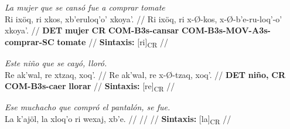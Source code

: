 \documentclass{article}%
\begin{document}
%
\par\medskip%
\ex
\textit{La mujer que se cansó fue a comprar tomate} \\
\begingl
\gla Ri ixöq, ri xkos, xb'eruloq'o' xkoya'. //
\glb Ri ixöq, ri x-Ø-kos, x-Ø-b'e-ru-loq'-o' xkoya'. //
\glc \textbf{DET} \textbf{mujer} \textbf{CR} \textbf{COM-}\textbf{B3s-}\textbf{cansar} \textbf{COM-}\textbf{B3s-}\textbf{MOV-}\textbf{A3s-}\textbf{comprar-}\textbf{SC} \textbf{tomate} //
\glft \textbf{Sintaxis:} [ri]\textsubscript{CR} //
\endgl
\xe
%
\medskip%
\par\medskip%
\ex
\textit{Este niño que se cayó, lloró.} \\
\begingl
\gla Re ak'wal, re xtzaq, xoq'. //
\glb Re ak'wal, re x-Ø-tzaq, xoq'. //
\glc \textbf{DET} \textbf{niño,} \textbf{CR} \textbf{COM-}\textbf{B3s-}\textbf{caer} \textbf{llorar} //
\glft \textbf{Sintaxis:} [re]\textsubscript{CR} //
\endgl
\xe
%
\medskip%
\par\medskip%
\ex
\textit{Ese muchacho que compró el pantalón, se fue.} \\
\begingl
\gla La k'ajöl, la xloq'o ri wexaj, xb'e. //
\glb  //
\glc  //
\glft \textbf{Sintaxis:} [la]\textsubscript{CR} //
\endgl
\xe
%
\medskip

%
\end{document}
